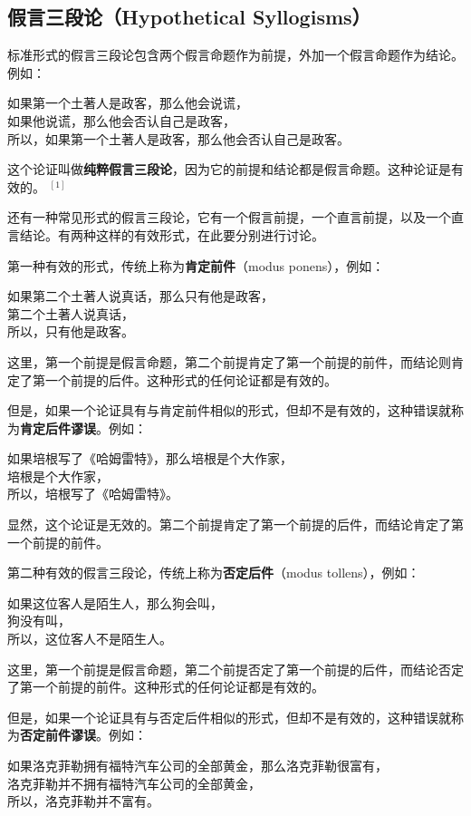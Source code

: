 \subsection{假言三段论（Hypothetical Syllogisms）}
标准形式的假言三段论包含两个假言命题作为前提，外加一个假言命题作为结论。例如：

如果第一个土著人是政客，那么他会说谎，\\
如果他说谎，那么他会否认自己是政客，\\
所以，如果第一个土著人是政客，那么他会否认自己是政客。

这个论证叫做\textbf{纯粹假言三段论}，因为它的前提和结论都是假言命题。这种论证是有效的。 ${ }^{[1]}$

还有一种常见形式的假言三段论，它有一个假言前提，一个直言前提，以及一个直言结论。有两种这样的有效形式，在此要分别进行讨论。

第一种有效的形式，传统上称为\textbf{肯定前件}（modus ponens），例如：

如果第二个土著人说真话，那么只有他是政客，\\
第二个土著人说真话，\\
所以，只有他是政客。

这里，第一个前提是假言命题，第二个前提肯定了第一个前提的前件，而结论则肯定了第一个前提的后件。这种形式的任何论证都是有效的。

但是，如果一个论证具有与肯定前件相似的形式，但却不是有效的，这种错误就称为\textbf{肯定后件谬误}。例如：

如果培根写了《哈姆雷特》，那么培根是个大作家，\\
培根是个大作家，\\
所以，培根写了《哈姆雷特》。

显然，这个论证是无效的。第二个前提肯定了第一个前提的后件，而结论肯定了第一个前提的前件。

第二种有效的假言三段论，传统上称为\textbf{否定后件}（modus tollens），例如：

如果这位客人是陌生人，那么狗会叫，\\
狗没有叫，\\
所以，这位客人不是陌生人。

这里，第一个前提是假言命题，第二个前提否定了第一个前提的后件，而结论否定了第一个前提的前件。这种形式的任何论证都是有效的。

但是，如果一个论证具有与否定后件相似的形式，但却不是有效的，这种错误就称为\textbf{否定前件谬误}。例如：

如果洛克菲勒拥有福特汽车公司的全部黄金，那么洛克菲勒很富有，\\
洛克菲勒并不拥有福特汽车公司的全部黄金，\\
所以，洛克菲勒并不富有。

